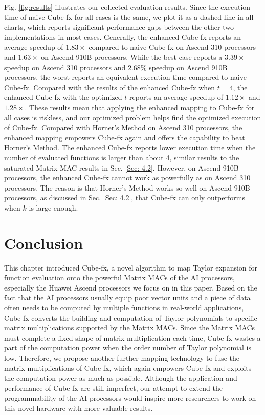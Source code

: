 Fig. \ref{fig:results} illustrates our collected evaluation results. Since the execution time of naive Cube-fx for all cases is the same, we plot it as a dashed line in all charts, which reports significant performance gaps between the other two implementations in most cases. Generally, the enhanced Cube-fx reports an average speedup of $1.83\times$ compared to naive Cube-fx on Ascend 310 processors and $1.63\times$ on Ascend 910B processors. While the best case reports a $3.39\times$ speedup on Ascend 310 processors and $2.68\%$ speedup on Ascend 910B processors, the worst reports an equivalent execution time compared to naive Cube-fx. Compared with the results of the enhanced Cube-fx when $t = 4$, the enhanced Cube-fx with the optimized $t$ reports an average speedup of $1.12\times$ and $1.28\times$. These results mean that applying the enhanced mapping to Cube-fx for all cases is riskless, and our optimized problem helps find the optimized execution of Cube-fx. Compared with Horner's Method on Ascend 310 processors, the enhanced mapping empowers Cube-fx again and offers the capability to beat Horner's Method. The enhanced Cube-fx reports lower execution time when the number of evaluated functions is larger than about 4, similar results to the saturated Matrix MAC results in Sec. \ref{Sec: 4.2}. However, on Ascend 910B processors, the enhanced Cube-fx cannot work as powerfully as on Ascend 310 processors. The reason is that Horner's Method works so well on Ascend 910B processors, as discussed in Sec. \ref{Sec: 4.2}, that Cube-fx can only outperforms when $k$ is large enough.

\section{Conclusion \label{sec:8}}

This chapter introduced Cube-fx, a novel algorithm to map Taylor expansion for function evaluation onto the powerful Matrix MACs of the AI processors, especially the Huawei Ascend processors we focus on in this paper. Based on the fact that the AI processors usually equip poor vector units and a piece of data often needs to be computed by multiple functions in real-world applications, Cube-fx converts the building and computation of Taylor polynomials to specific matrix multiplications supported by the Matrix MACs. Since the Matrix MACs must complete a fixed shape of matrix multiplication each time, Cube-fx wastes a part of the computation power when the order number of Taylor polynomial is low. Therefore, we propose another further mapping technology to fuse the matrix multiplications of Cube-fx, which again empowers Cube-fx and exploits the computation power as much as possible. Although the application and performance of Cube-fx are still imperfect, our attempt to extend the programmability of the AI processors would inspire more researchers to work on this novel hardware with more valuable results.
